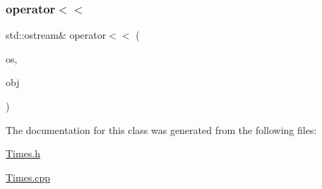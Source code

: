 \subsubsection{\texorpdfstring{operator$<$$<$}{operator<<}}
{\footnotesize\ttfamily std\+::ostream\& operator$<$$<$ (\begin{DoxyParamCaption}\item[{std\+::ostream \&}]{os,  }\item[{\mbox{\hyperlink{class_f_l_ts}{F\+L\+Ts}} const \&}]{obj }\end{DoxyParamCaption})\hspace{0.3cm}{\ttfamily [friend]}}



The documentation for this class was generated from the following files\+:\begin{DoxyCompactItemize}
\item 
\mbox{\hyperlink{_times_8h}{Times.\+h}}\item 
\mbox{\hyperlink{_times_8cpp}{Times.\+cpp}}\end{DoxyCompactItemize}
